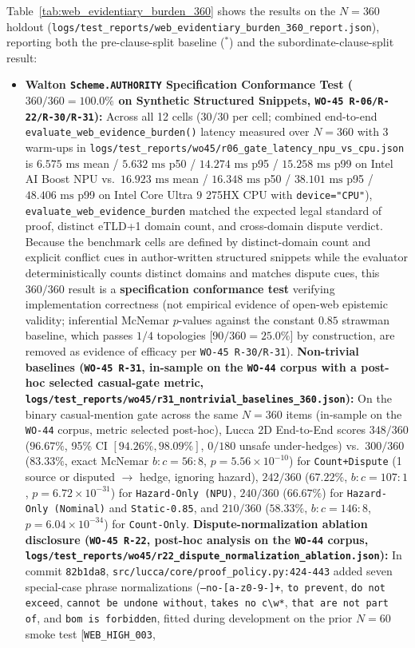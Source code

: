 \documentclass[11pt,a4paper]{article}
\begin{document}
Table~\ref{tab:web_evidentiary_burden_360} shows the results on the $N=360$ holdout (\texttt{logs/test\_reports/web\_evidentiary\_burden\_360\_report.json}), reporting both the pre-clause-split baseline ($^*$) and the subordinate-clause-split result:
\begin{itemize}
    \item \textbf{Walton \texttt{Scheme.AUTHORITY} Specification Conformance Test ($360/360 = 100.0\%$ on Synthetic Structured Snippets, \texttt{WO-45 R-06/R-22/R-30/R-31}):} Across all 12 cells ($30/30$ per cell; combined end-to-end \texttt{evaluate\_web\_evidence\_burden()} latency measured over $N=360$ with 3 warm-ups in \texttt{logs/test\_reports/wo45/r06\_gate\_latency\_npu\_vs\_cpu.json} is $6.575\text{ ms}$ mean / $5.632\text{ ms}$ p50 / $14.274\text{ ms}$ p95 / $15.258\text{ ms}$ p99 on Intel AI Boost NPU vs.\ $16.923\text{ ms}$ mean / $16.348\text{ ms}$ p50 / $38.101\text{ ms}$ p95 / $48.406\text{ ms}$ p99 on Intel Core Ultra 9 275HX CPU with \texttt{device="CPU"}), \texttt{evaluate\_web\_evidence\_burden} matched the expected legal standard of proof, distinct eTLD+1 domain count, and cross-domain dispute verdict. Because the benchmark cells are defined by distinct-domain count and explicit conflict cues in author-written structured snippets while the evaluator deterministically counts distinct domains and matches dispute cues, this $360/360$ result is a \textbf{specification conformance test} verifying implementation correctness (not empirical evidence of open-web epistemic validity; inferential McNemar $p$-values against the constant $0.85$ strawman baseline, which passes $1/4$ topologies [$90/360 = 25.0\%$] by construction, are removed as evidence of efficacy per \texttt{WO-45 R-30/R-31}). \textbf{Non-trivial baselines (\texttt{WO-45 R-31}, in-sample on the \texttt{WO-44} corpus with a post-hoc selected casual-gate metric, \texttt{logs/test\_reports/wo45/r31\_nontrivial\_baselines\_360.json}):} On the binary casual-mention gate across the same $N=360$ items (in-sample on the \texttt{WO-44} corpus, metric selected post-hoc), Lucca 2D End-to-End scores $348/360$ ($96.67\%$, 95\% CI $[94.26\%, 98.09\%]$, $0/180$ unsafe under-hedges) vs.\ $300/360$ ($83.33\%$, exact McNemar $b:c = 56:8$, $p = 5.56 \times 10^{-10}$) for \texttt{Count+Dispute} (1 source or disputed $\rightarrow$ hedge, ignoring hazard), $242/360$ ($67.22\%$, $b:c = 107:1$, $p = 6.72 \times 10^{-31}$) for \texttt{Hazard-Only (NPU)}, $240/360$ ($66.67\%$) for \texttt{Hazard-Only (Nominal)} and \texttt{Static-0.85}, and $210/360$ ($58.33\%$, $b:c = 146:8$, $p = 6.04 \times 10^{-34}$) for \texttt{Count-Only}. \textbf{Dispute-normalization ablation disclosure (\texttt{WO-45 R-22}, post-hoc analysis on the \texttt{WO-44} corpus, \texttt{logs/test\_reports/wo45/r22\_dispute\_normalization\_ablation.json}):} In commit \texttt{82b1da8}, \texttt{src/lucca/core/proof\_policy.py:424-443} added seven special-case phrase normalizations (\texttt{--no-[a-z0-9-]+}, \texttt{to prevent}, \texttt{do not exceed}, \texttt{cannot be undone without}, \texttt{takes no c\textbackslash w*}, \texttt{that are not part of}, and \texttt{bom is forbidden}, fitted during development on the prior $N=60$ smoke test [\texttt{WEB\_HIGH\_003}, 
\end{itemize}
\end{document}
